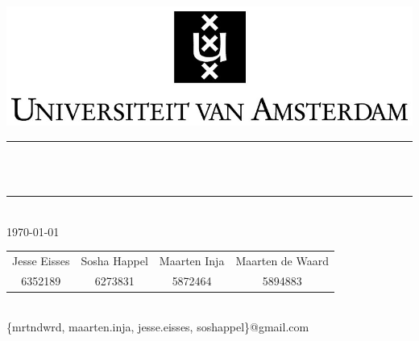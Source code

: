 \newcommand{\HRule}{\rule{\linewidth}{0.5mm}}

\begin{titlepage}
\begin{center}
\includegraphics[width=1\textwidth]{uva}\\[0.5cm]

\HRule \\[0.2cm]
{ \huge \LARGE \textbf{\projectName}\\[0.1cm]
\large \textsc{\projectAbbreviation}
 \vspace{0.2cm}}
\HRule \\[0.4cm]
\Large \today

\vfill

\begin{tabular}{cccc}
Jesse Eisses & Sosha Happel & Maarten Inja & Maarten de Waard \\ 
6352189 & 6273831 & 5872464 & 5894883 
\end{tabular} \\[0.3cm]

\large \{mrtndwrd, maarten.inja, jesse.eisses, soshappel\}@gmail.com 
\end{center}
\end{titlepage}

%
%
